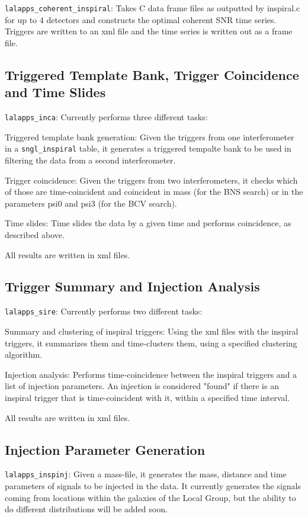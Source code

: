 \texttt{lalapps\_coherent\_inspiral}: Takes C data frame files as 
outputted by inspiral.c for up to 4 detectors and constructs the optimal 
coherent SNR time series.  Triggers are written to an xml file and the time 
series is written out as a frame file.

\subsection{Triggered Template Bank, Trigger Coincidence and Time Slides}

\texttt{lalapps\_inca}: Currently performs three different tasks:

Triggered template bank generation: Given the triggers from one interferometer
in a \verb$sngl_inspiral$ table, it generates a triggered tempalte bank to be
used in filtering the data from a second interferometer. 

Trigger coincidence: Given the triggers from two interferometers, it checks
which of those are time-coincident and coincident in mass (for the BNS search)
or in the parameters psi0 and psi3 (for the BCV search).

Time slides: Time slides the data by a given time and performs coincidence,
as described above.

All results are written in xml files.


\subsection{Trigger Summary and Injection Analysis}

\texttt{lalapps\_sire}: Currently performs two different tasks:

Summary and clustering of inspiral triggers: Using the xml files with the
inspiral triggers, it summarizes them and time-clusters them, using a
specified clustering algorithm.

Injection analysis: Performs time-coincidence between  the inspiral triggers 
and a list of injection parameters. An injection is considered "found" if
there is an inspiral trigger that is time-coincident with it, within a 
specified time interval.

All results are written in xml files.

\subsection{Injection Parameter Generation}

\texttt{lalapps\_inspinj}: Given a mass-file, it generates the mass,
  distance and time parameters of signals to be injected in the data.
  It currently generates the signals coming from locations within the
  galaxies of the Local Group, but the ability to do different distributions
  will be added soon.

